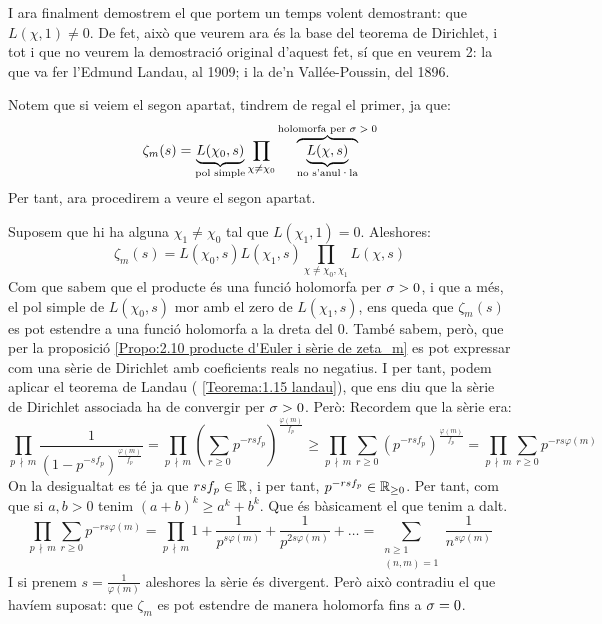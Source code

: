 I ara finalment demostrem el que portem un temps volent demostrant: que $L(\chi,1)\neq 0$. De fet, això que veurem ara és la base del teorema de Dirichlet, i tot i que no veurem la demostració original d'aquest fet, sí que en veurem 2: la que va fer l'Edmund Landau, al 1909; i la de'n Vallée-Poussin, del 1896.
\begin{pf}
    Notem que si veiem el segon apartat, tindrem de regal el primer, ja que:
    \[
    \zeta_m(s)=\underbrace{L(\chi_0,s)}_{\text{pol simple}}\prod_{\chi\neq\chi_0}\overbrace{\underbrace{L(\chi,s)}_{\text{no s'anul·la}}}^{\text{holomorfa per $\sigma>0$}}
    \]
    Per tant, ara procedirem a veure el segon apartat.\par
    Suposem que hi ha alguna $\chi_1\neq\chi_0$ tal que $L(\chi_1,1)=0$. Aleshores:
    \[
    \zeta_m(s)=L(\chi_0,s)L(\chi_1,s)\prod_{\chi\neq\chi_0,\chi_1}L(\chi,s)
    \]
    Com que sabem que el producte és una funció holomorfa per $\sigma>0$, i que a més, el pol simple de $L(\chi_0,s)$ mor amb el zero de $L(\chi_1,s)$, ens queda que
    $\zeta_m(s)$ es pot estendre a una funció holomorfa a la dreta del 0. També sabem, però, que per la proposició \ref{Propo:2.10 producte d'Euler i sèrie de zeta_m} es pot expressar com una sèrie de Dirichlet amb coeficients reals no negatius. I per tant, podem aplicar el teorema de Landau (
    \ref{Teorema:1.15 landau}), que ens diu que la sèrie de Dirichlet associada ha de convergir per $\sigma>0$. Però:
    Recordem que la sèrie era:
    \[
    \prod_{p\,\nmid\, m}\frac{1}{(1-p^{-sf_p})^{\frac{\varphi(m)}{f_p}}}=
    \prod_{p\,\nmid\, m}\left(\sum_{r\geq0}p^{-rsf_p}\right)^{\frac{\varphi(m)}{f_p}}\geq
    \prod_{p\,\nmid\, m}\sum_{r\geq0}\left(p^{-rsf_p}\right)^{\frac{\varphi(m)}{f_p}}=
    \prod_{p\,\nmid\, m}\sum_{r\geq0}p^{-rs\varphi(m)}
    \]
    On la desigualtat es té ja que $rsf_p\in\mathbb R$, i per tant, $p^{-rsf_p}\in \mathbb R_{\geq0}$. Per tant, com que si $a,b>0$ tenim $(a+b)^k\geq a^k+b^k$. Que és bàsicament 
    el que tenim a dalt.
    \[
    \prod_{p\,\nmid\, m}\sum_{r\geq0}p^{-rs\varphi(m)}=
    \prod_{p\,\nmid\, m}1+\frac{1}{p^{s\varphi(m)}}+\frac{1}{p^{2s\varphi(m)}}+\dots=
    \sum_{\substack{n\geq1\\(n,m)=1}}\frac{1}{n^{s\varphi(m)}}
    \]
    I si prenem $s=\frac{1}{\varphi(m)}$ aleshores la sèrie és divergent. Però això contradiu el que havíem suposat: que $\zeta_m$ es pot estendre de manera holomorfa fins a $\sigma=0$.
\end{pf}
